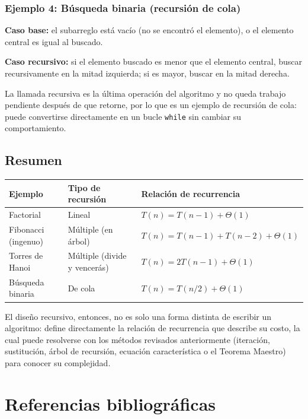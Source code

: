 \documentclass{article}
\begin{document}
\subsubsection{Ejemplo 4: Búsqueda binaria (recursión de cola)}
 
\textbf{Caso base:} el subarreglo está vacío (no se encontró el elemento), o
el elemento central es igual al buscado.

\textbf{Caso recursivo:} si el elemento buscado es menor que el elemento
central, buscar recursivamente en la mitad izquierda; si es mayor, buscar en
la mitad derecha.
 
La llamada recursiva es la última operación del algoritmo y no queda trabajo
pendiente después de que retorne, por lo que es un ejemplo de recursión de
cola: puede convertirse directamente en un bucle \texttt{while} sin cambiar
su comportamiento.
 
\subsection{Resumen}
 
\begin{center}
\small
\renewcommand{\arraystretch}{1.5}
\begin{tabular}{|l|l|l|}
\hline
\textbf{Ejemplo} & \textbf{Tipo de recursión} & \textbf{Relación de recurrencia} \\
\hline
Factorial & Lineal & $T(n) = T(n-1) + \Theta(1)$ \\
\hline
Fibonacci (ingenuo) & Múltiple (en árbol) & $T(n) = T(n-1) + T(n-2) + \Theta(1)$ \\
\hline
Torres de Hanoi & Múltiple (divide y vencerás) & $T(n) = 2T(n-1) + \Theta(1)$ \\
\hline
Búsqueda binaria & De cola & $T(n) = T(n/2) + \Theta(1)$ \\
\hline
\end{tabular}
\end{center}
 
El diseño recursivo, entonces, no es solo una forma distinta de escribir un
algoritmo: define directamente la relación de recurrencia que describe su
costo, la cual puede resolverse con los métodos revisados anteriormente
(iteración, sustitución, árbol de recursión, ecuación característica o el
Teorema Maestro) para conocer su complejidad.

\section{Referencias bibliográficas}
    
    \nocite{*}
    
\end{document}
